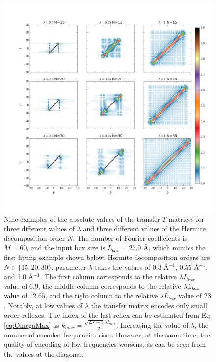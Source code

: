 \begin{figure}[H]
\label{fig:TmatrixesVsLambda}
\begin{centering}
\includegraphics[width=\textwidth]{Hermite/Fig/TmatrixesPlot.png}
\par\end{centering}
\caption[Transfer $T$-matrices]{Nine examples of the absolute values of the transfer $T$-matrices for three different values of $\lambda$ and  three different values of the Hermite decomposition order $N$. 
The number of Fourier coefficients is $M=60$, and the input box size is $L_{box}=23.0$ \AA, which mimics
the first fitting example shown below.
Hermite decomposition orders are $N\in\{15, 20, 30\}$, parameter $\lambda$ takes the values of 0.3 \AA$^{-1}$, 0.55 \AA$^{-1}$, and 1.0 \AA$^{-1}$.
The first column corresponds to the relative $\lambda L_{box}$ value of 6.9, the middle column corresponds to the relative $\lambda L_{box}$ value of $12.65$, and the 
right column to the relative $\lambda L_{box}$ value of $23$.
Notably, at low values of $\lambda$ the transfer matrix encodes only small order reflexes. The index of the last reflex can be estimated  from Eq. \ref{eq:OmegaMax} as $k_{max}=\frac{\sqrt{2N+1}\lambda L_{box}}{2\pi}$.
Increasing the value of $\lambda$, the number of encoded frequencies rises. However, at the same time, the quality of encoding of low frequencies worsens, as can be seen from the values at the diagonal.
}
\end{figure}

